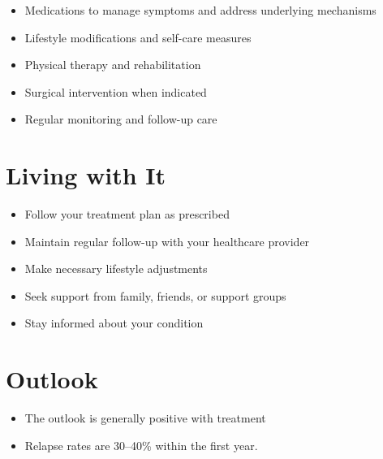 \begin{itemize}[noitemsep]
  \item Medications to manage symptoms and address underlying mechanisms
  \item Lifestyle modifications and self-care measures
  \item Physical therapy and rehabilitation
  \item Surgical intervention when indicated
  \item Regular monitoring and follow-up care
\end{itemize}
\section{Living with It}
\begin{itemize}[noitemsep]
  \item Follow your treatment plan as prescribed
  \item Maintain regular follow-up with your healthcare provider
  \item Make necessary lifestyle adjustments
  \item Seek support from family, friends, or support groups
  \item Stay informed about your condition
\end{itemize}
\section{Outlook}
\begin{itemize}[noitemsep]
  \item The outlook is generally positive with treatment
  \item Relapse rates are 30--40\% within the first year.
\end{itemize}
